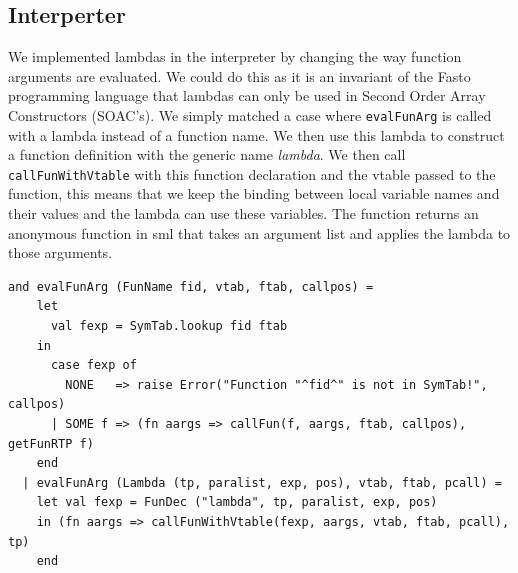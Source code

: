 \documentclass[11pt]{article}
\begin{document}
\subsection{Interperter}
    We implemented lambdas in the interpreter by changing the way function
    arguments are evaluated.  We could do this as it is an invariant of the
    Fasto programming language that lambdas can only be used in Second Order
    Array Constructors (SOAC's).  We simply matched a case where
    \texttt{evalFunArg} is called with a lambda instead of a function name.  We
    then use this lambda to construct a function definition with the generic
    name \textit{lambda}.  We then call \texttt{callFunWithVtable} with this
    function declaration and the vtable passed to the function, this means that
    we keep the binding between local variable names and their values and the
    lambda can use these variables.  The function returns an anonymous function
    in sml that takes an argument list and applies the lambda to those
    arguments.

    \begin{lstlisting}[basicstyle=\small]
and evalFunArg (FunName fid, vtab, ftab, callpos) =
    let
      val fexp = SymTab.lookup fid ftab
    in
      case fexp of
        NONE   => raise Error("Function "^fid^" is not in SymTab!", callpos)
      | SOME f => (fn aargs => callFun(f, aargs, ftab, callpos), getFunRTP f)
    end
  | evalFunArg (Lambda (tp, paralist, exp, pos), vtab, ftab, pcall) =
    let val fexp = FunDec ("lambda", tp, paralist, exp, pos)
    in (fn aargs => callFunWithVtable(fexp, aargs, vtab, ftab, pcall), tp)
    end
    \end{lstlisting}
\end{document}
